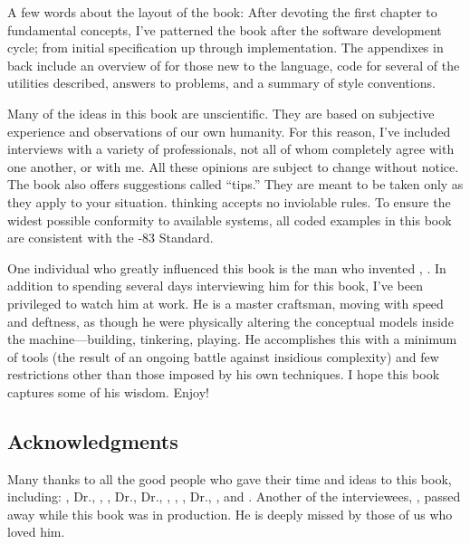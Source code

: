 A few words about the layout of the book: After devoting the first
chapter to fundamental concepts, I've patterned the book after the
software development cycle; from initial specification up through
implementation. The appendixes in back include an overview of \Forth{}
for those new to the language, code for several of the utilities described,
answers to problems, and a summary of style conventions.

Many of the ideas in this book are unscientific. They are based on
subjective experience and observations of our own humanity. For this
reason, I've included interviews with a variety of \Forth{}
professionals, not all of whom completely agree with one another, or
with me. All these opinions are subject to change without notice. The
book also offers suggestions called ``tips.'' They are meant to be
taken only as they apply to your situation. \Forth{} thinking accepts
no inviolable rules.  To ensure the widest possible conformity to
available \Forth{} systems, all coded examples in this book are
consistent with the \Forth{}-83 Standard.

One individual who greatly influenced this book is the man who
invented \Forth{}, . In addition to spending
several days interviewing him for this book, I've been privileged to
watch him at work. He is a master craftsman, moving with speed and
deftness, as though he were physically altering the conceptual models
inside the machine---building, tinkering, playing. He accomplishes
this with a minimum of tools (the result of an ongoing battle against
insidious complexity) and few restrictions other than those imposed by
his own techniques. I hope this book captures some of his
wisdom. Enjoy!


\subsection{Acknowledgments}

Many thanks to all the good people who gave their time and ideas to
this book, including: , Dr.\@ {}, , ,
Dr.\@ {}, Dr.\@ {}, , , ,
Dr.\@ {}, , and . Another of the interviewees, , passed
away while this book was in production. He is deeply missed by those
of us who loved him.

